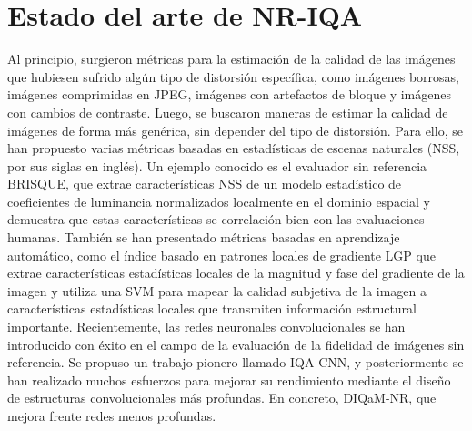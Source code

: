 \section{Estado del arte de NR-IQA}
Al principio, surgieron métricas para la estimación de la calidad de las imágenes 
que hubiesen sufrido algún tipo de distorsión específica, 
como imágenes borrosas\cite{GradientBasedBlurAssessment}, 
imágenes comprimidas en JPEG\cite{JPEGBasedOnLuminance}, 
imágenes con artefactos de bloque\cite{DeblockedImages} y imágenes con cambios de contraste\cite{ContrastDistorted}.
Luego, se buscaron maneras de estimar la calidad de imágenes de forma más genérica, 
sin depender del tipo de distorsión. Para ello, se han propuesto varias métricas 
basadas en estadísticas de escenas naturales (NSS, por sus siglas en inglés). 
Un ejemplo conocido es el evaluador sin referencia BRISQUE\cite{BRISQUE}, que extrae 
características NSS de un modelo estadístico de coeficientes de luminancia 
normalizados localmente en el dominio espacial y demuestra que estas características 
se correlación bien con las evaluaciones humanas.
También se han presentado métricas basadas en aprendizaje automático, 
como el índice basado en patrones locales de gradiente LGP\cite{LGP} que extrae 
características estadísticas locales de la magnitud y fase del gradiente de la imagen y utiliza una 
SVM para mapear la calidad subjetiva de la imagen a 
características estadísticas locales que transmiten información estructural importante.
Recientemente, las redes neuronales convolucionales se han introducido con 
éxito en el campo de la evaluación de la fidelidad de imágenes sin referencia. 
Se propuso un trabajo pionero llamado IQA-CNN\cite{IQA-CNN}, 
y posteriormente se han realizado muchos esfuerzos para mejorar su rendimiento 
mediante el diseño de estructuras convolucionales más profundas. En concreto,
DIQaM-NR\cite{DIQaM}, que mejora frente redes menos profundas.

